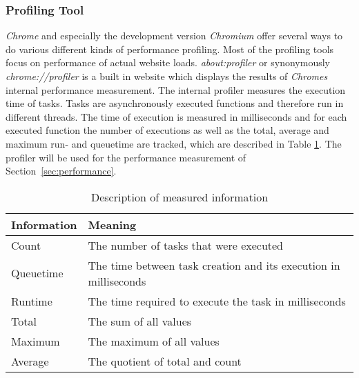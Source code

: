 \subsubsection{Profiling Tool}
\label{sec:profiler}
\emph{Chrome} and especially the development version \emph{Chromium} offer several ways to do various different kinds of performance profiling. Most of the profiling tools focus on performance of actual website loads. \emph{about:profiler} or synonymously \emph{chrome://profiler} is a built in website which displays the results of \emph{Chromes} internal performance measurement. The internal profiler measures the execution time of tasks. Tasks are asynchronously executed functions and therefore run in different threads. The time of execution is measured in milliseconds and for each executed function the number of executions as well as the total, average and maximum run- and queuetime are tracked, which are described in Table \ref{fig:ex1_info}. The profiler will be used for the performance measurement of Section~\ref{sec:performance}.
\begin{table}
\caption{Description of measured information}
\label{fig:ex1_info}
\begin{tabularx}{\textwidth}{|l|X|}
\hline
Information & Meaning \\ \hline
Count & The number of tasks that were executed \\ \hline
Queuetime & The time between task creation and its execution in milliseconds \\ \hline
Runtime & The time required to execute the task in milliseconds \\ \hline
Total & The sum of all values \\ \hline
Maximum & The maximum of all values \\ \hline
Average & The quotient of total and count \\ \hline
\end{tabularx}
\end{table}